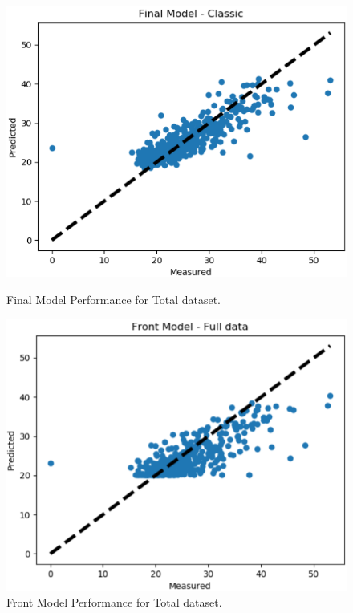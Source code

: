 \documentclass[conference]{IEEEtran}
\begin{document}
\begin{figure}[H]
    \centering
    \begin{minipage}[b]{0.25\textwidth}
        \includegraphics[width=\linewidth]{compscatter.png}
        \caption{Final Model Performance for Total dataset.}
        \label{fig:compscatter}
        \end{minipage}
        \hspace{1cm}
    \begin{minipage}[b]{0.25\textwidth}
    \includegraphics[width=\linewidth]{frontscatter.png}
    \caption{Front Model Performance for Total dataset.}
    \label{fig:frontscatter}

\end{minipage}
\end{figure}
\end{document}
